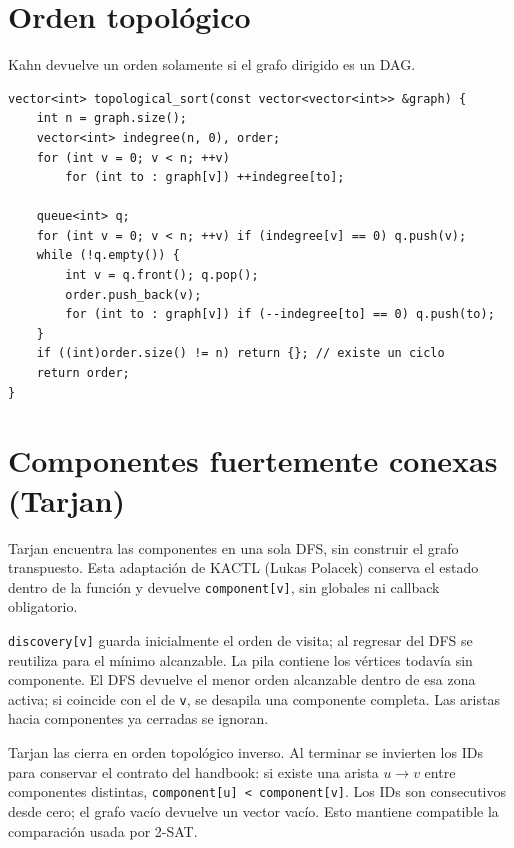 \section{Orden topol\'ogico}

Kahn devuelve un orden solamente si el grafo dirigido es un DAG.

\begin{lstlisting}[style=cpp]
vector<int> topological_sort(const vector<vector<int>> &graph) {
    int n = graph.size();
    vector<int> indegree(n, 0), order;
    for (int v = 0; v < n; ++v)
        for (int to : graph[v]) ++indegree[to];

    queue<int> q;
    for (int v = 0; v < n; ++v) if (indegree[v] == 0) q.push(v);
    while (!q.empty()) {
        int v = q.front(); q.pop();
        order.push_back(v);
        for (int to : graph[v]) if (--indegree[to] == 0) q.push(to);
    }
    if ((int)order.size() != n) return {}; // existe un ciclo
    return order;
}
\end{lstlisting}


\section{Componentes fuertemente conexas (Tarjan)}

Tarjan encuentra las componentes en una sola DFS, sin construir el grafo
transpuesto. Esta adaptación de KACTL (Lukas Polacek) conserva el estado dentro de la función
y devuelve \texttt{component[v]}, sin globales ni callback obligatorio.

\texttt{discovery[v]} guarda inicialmente el orden de visita; al regresar
del DFS se reutiliza para el mínimo alcanzable. La pila contiene los vértices
todavía sin componente. El DFS devuelve el menor orden alcanzable dentro de
esa zona activa; si coincide con el de \texttt{v}, se desapila una componente
completa. Las aristas hacia componentes ya cerradas se ignoran.

Tarjan las cierra en orden topológico inverso. Al terminar se invierten los
IDs para conservar el contrato del handbook: si existe una arista $u\to v$
entre componentes distintas, \texttt{component[u] < component[v]}.
Los IDs son consecutivos desde cero; el grafo vacío devuelve un vector vacío.
Esto mantiene compatible la comparación usada por 2-SAT.

